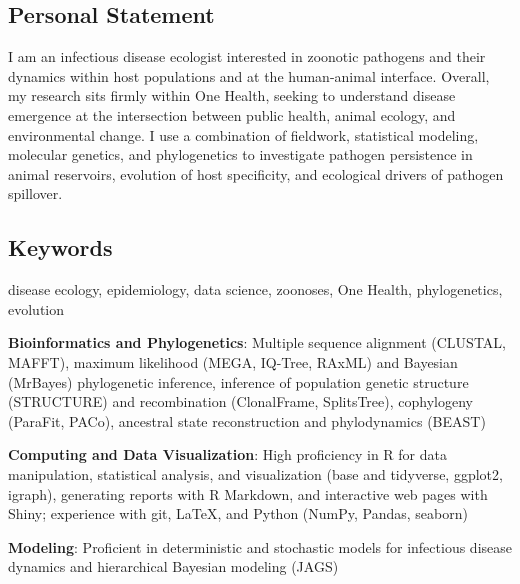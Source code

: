 \documentclass{cv}
\begin{document}
\subsection*{Personal Statement}

I am an infectious disease ecologist interested in zoonotic pathogens and their dynamics within host populations and at the human-animal interface. Overall, my research sits firmly within One Health, seeking to understand disease emergence at the intersection between public health, animal ecology, and environmental change. I use a combination of fieldwork, statistical modeling, molecular genetics, and phylogenetics to investigate pathogen persistence in animal reservoirs, evolution of host specificity, and ecological drivers of pathogen spillover.

\subsection*{Keywords}

disease ecology, epidemiology, data science, zoonoses, One Health, phylogenetics, evolution


\textbf{Bioinformatics and Phylogenetics}: Multiple sequence alignment (CLUSTAL, MAFFT), maximum likelihood (MEGA, IQ-Tree, RAxML) and Bayesian (MrBayes) phylogenetic inference, inference of population genetic structure (STRUCTURE) and recombination (ClonalFrame, SplitsTree), cophylogeny (ParaFit, PACo), ancestral state reconstruction and phylodynamics (BEAST)

\textbf{Computing and Data Visualization}: High proficiency in R for data manipulation, statistical analysis, and visualization (base and tidyverse, ggplot2, igraph), generating reports with R Markdown, and interactive web pages with Shiny; experience with git, \LaTeX, and Python (NumPy, Pandas, seaborn)

\textbf{Modeling}: Proficient in deterministic and stochastic models for infectious disease dynamics and hierarchical Bayesian modeling (JAGS)
\end{document}
